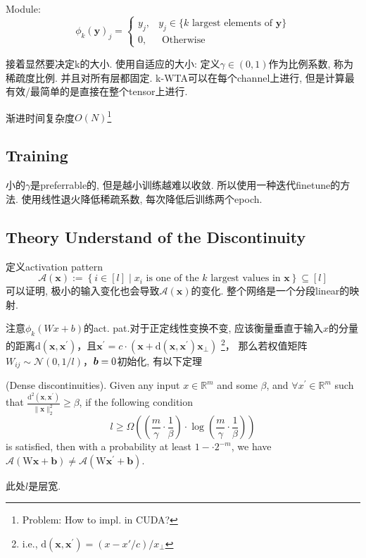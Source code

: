 \documentclass{article}
\begin{document}
\kwta Module:
\begin{equation}
    \phi_{k}(\boldsymbol{y})_{j}=\left\{\begin{array}{ll}
    y_{j}, & y_{j} \in\{k \text { largest elements of } \boldsymbol{y}\} \\
    0, & \text { Otherwise }
    \end{array}\right.
\end{equation}

接着显然要决定k的大小. 使用自适应的大小: 定义$\gamma \in (0, 1)$作为比例系数, 称为稀疏度比例. 并且对所有层都固定. k-WTA可以在每个channel上进行, 但是计算最有效/最简单的是直接在整个tensor上进行.

渐进时间复杂度$O(N)$\footnote{
    Problem: How to impl. in CUDA?
}

\subsection{Training}
小的$\gamma$是preferrable的, 但是越小训练越难以收敛. 所以使用一种迭代finetune的方法. 使用线性退火降低稀疏系数, 每次降低后训练两个epoch.

\subsection{Theory Understand of the Discontinuity}

定义activation pattern
\begin{equation}
    \mathcal{A}(\boldsymbol{x}):=\left\{i \in[l] \mid x_{i} \text { is one of the } k \text { largest values in } \boldsymbol{x}\right\} \subseteq[l]
\end{equation}
可以证明, 极小的输入变化也会导致$\mathcal{A}(\boldsymbol{x})$的变化. 整个网络是一个分段linear的映射.

注意$\phi_{k}(W x+b)$的act. pat.对于正定线性变换不变, 应该衡量垂直于输入$x$的分量的距离$\mathrm{d}\left(\boldsymbol{x}, \boldsymbol{x}^{\prime}\right)$，且$\boldsymbol{x}^{\prime}=c \cdot\left(\boldsymbol{x}+\mathrm{d}\left(\boldsymbol{x}, \boldsymbol{x}^{\prime}\right) \boldsymbol{x}_{\perp}\right)$
\footnote{
    i.e., $\mathrm{d}\left(\boldsymbol{x}, \boldsymbol{x}^{\prime}\right)=(x-x'/c)/x_\perp$
}， 
那么若权值矩阵$W_{ij} \sim \mathcal N(0, 1/l)$，$\boldsymbol{b}=0$初始化, 有以下定理
\begin{theorem}
    (Dense discontinuities). Given any input $x \in \mathbb{R}^{m}$ and some $\beta$, and $\forall x^{\prime} \in \mathbb{R}^{m}$ such that $\frac{\mathrm{d}^{2}\left(\boldsymbol{x}, \boldsymbol{x}^{\prime}\right)}{\|\boldsymbol{x}\|_{2}^{2}} \geq \beta$, if the following condition
    $$
    l \geq \Omega\left(\left(\frac{m}{\gamma} \cdot \frac{1}{\beta}\right) \cdot \log \left(\frac{m}{\gamma} \cdot \frac{1}{\beta}\right)\right)
    $$
    is satisfied, then with a probability at least $1-\cdot 2^{-m}$, we have $\mathcal{A}(\mathrm{W} \boldsymbol{x}+\boldsymbol{b}) \neq \mathcal{A}\left(\mathrm{W} \boldsymbol{x}^{\prime}+\boldsymbol{b}\right) .$
\end{theorem}
此处$l$是层宽.
\end{document}
